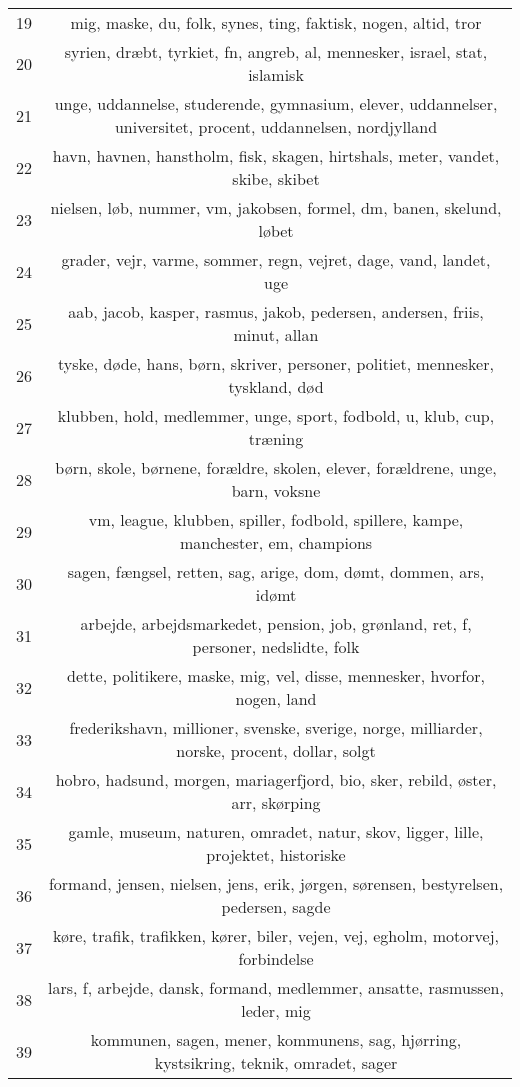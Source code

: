 \begin{longtable}[c]{c | c}
		19 & mig, maske, du, folk, synes, ting, faktisk, nogen, altid, tror \\
		20 & syrien, dræbt, tyrkiet, fn, angreb, al, mennesker, israel, stat, islamisk \\
		21 & unge, uddannelse, studerende, gymnasium, elever, uddannelser, universitet, procent, uddannelsen, nordjylland \\
		22 & havn, havnen, hanstholm, fisk, skagen, hirtshals, meter, vandet, skibe, skibet \\
		23 & nielsen, løb, nummer, vm, jakobsen, formel, dm, banen, skelund, løbet \\
		24 & grader, vejr, varme, sommer, regn, vejret, dage, vand, landet, uge \\
		25 & aab, jacob, kasper, rasmus, jakob, pedersen, andersen, friis, minut, allan \\
		26 & tyske, døde, hans, børn, skriver, personer, politiet, mennesker, tyskland, død \\
		27 & klubben, hold, medlemmer, unge, sport, fodbold, u, klub, cup, træning \\
		28 & børn, skole, børnene, forældre, skolen, elever, forældrene, unge, barn, voksne \\
		29 & vm, league, klubben, spiller, fodbold, spillere, kampe, manchester, em, champions \\
		30 & sagen, fængsel, retten, sag, arige, dom, dømt, dommen, ars, idømt \\
		31 & arbejde, arbejdsmarkedet, pension, job, grønland, ret, f, personer, nedslidte, folk \\
		32 & dette, politikere, maske, mig, vel, disse, mennesker, hvorfor, nogen, land \\
		33 & frederikshavn, millioner, svenske, sverige, norge, milliarder, norske, procent, dollar, solgt \\
		34 & hobro, hadsund, morgen, mariagerfjord, bio, sker, rebild, øster, arr, skørping \\
		35 & gamle, museum, naturen, omradet, natur, skov, ligger, lille, projektet, historiske \\
		36 & formand, jensen, nielsen, jens, erik, jørgen, sørensen, bestyrelsen, pedersen, sagde \\
		37 & køre, trafik, trafikken, kører, biler, vejen, vej, egholm, motorvej, forbindelse \\
		38 & lars, f, arbejde, dansk, formand, medlemmer, ansatte, rasmussen, leder, mig \\
		39 & kommunen, sagen, mener, kommunens, sag, hjørring, kystsikring, teknik, omradet, sager \\

\end{longtable}
